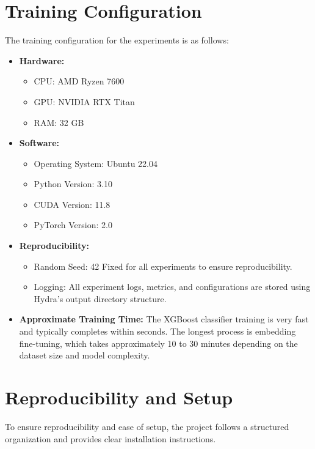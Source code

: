 \documentclass{SGGW-thesis-EN}
\begin{document}
\section{Training Configuration}
The training configuration for the experiments is as follows:
\begin{itemize}
    \item \textbf{Hardware:}
    \begin{itemize}
        \item CPU: AMD Ryzen 7600
        \item GPU: NVIDIA RTX Titan
        \item RAM: 32 GB
    \end{itemize}
    \item \textbf{Software:}
    \begin{itemize}
        \item Operating System: Ubuntu 22.04
        \item Python Version: 3.10
        \item CUDA Version: 11.8
        \item PyTorch Version: 2.0
    \end{itemize}
    \item \textbf{Reproducibility:}
    \begin{itemize}
        \item Random Seed: 42 Fixed for all experiments to ensure reproducibility.
        \item Logging: All experiment logs, metrics, and configurations are stored using Hydra's output directory structure.
    \end{itemize}
    \item \textbf{Approximate Training Time:} The XGBoost classifier training is very fast and typically completes within seconds. 
    The longest process is embedding fine-tuning, 
    which takes approximately 10 to 30 minutes depending on the dataset size and model complexity.
\end{itemize}

\section{Reproducibility and Setup}

To ensure reproducibility and ease of setup, the project follows a structured organization and provides clear installation instructions.
\end{document}
